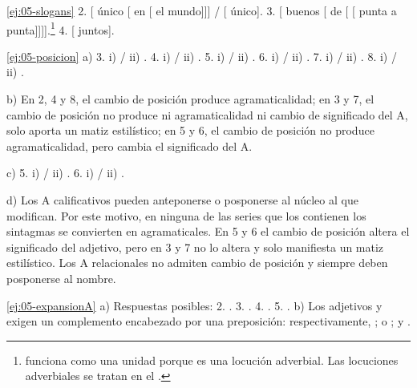 \begin{solucion}{\ref{ej:05-slogans}}
2. [ único [ en [ el
mundo]]] / [ único]. 3. [ buenos
[ de [ [ punta a
punta]]]].\footnote{ funciona como una unidad porque es
una locución adverbial. Las locuciones adverbiales se tratan en el
.} 4. [ juntos].
\end{solucion}

\begin{solucion}{\ref{ej:05-posicion}}
a) 3. i)  / ii) . 4. i)
 / ii) . 5.
i)  / ii) . 6. i)  / ii) . 7. i)  / ii)
. 8. i)  / ii)
.

b) En 2, 4 y 8, el cambio de posición produce agramaticalidad; en 3 y 7, el
cambio de posición no produce ni agramaticalidad ni cambio de significado del A,
solo aporta un matiz estilístico; en 5 y 6, el cambio de posición no produce
agramaticalidad, pero cambia el significado del A.

c) 5. i)  / ii) . 6. i)  / ii)
.

d) Los A calificativos pueden anteponerse o posponerse al núcleo al que
modifican. Por este motivo, en ninguna de las series que los contienen los
sintagmas se convierten en agramaticales. En 5 y 6 el cambio de posición altera
el significado del adjetivo, pero en 3 y 7 no lo altera y solo manifiesta un
matiz estilístico. Los A relacionales no admiten cambio de posición y siempre
deben posponerse al nombre.
\end{solucion}

\begin{solucion}{\ref{ej:05-expansionA}}
a) Respuestas posibles: 2. . 3. . 4.
. 5. . b) Los adjetivos  y  exigen un complemento encabezado por una
preposición: respectivamente, ;  o ; y
.
\end{solucion}

